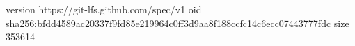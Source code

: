 version https://git-lfs.github.com/spec/v1
oid sha256:bfdd4589ac20337f9fd85e219964c0ff3d9aa8f188ccfc14c6ecc07443777fdc
size 353614

